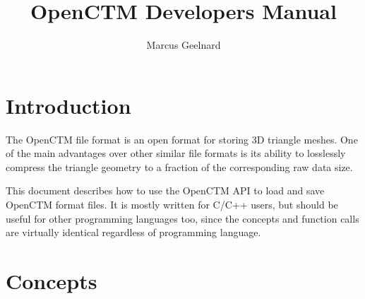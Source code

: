 %
%



\author{Marcus Geelnard}
\title{OpenCTM Developers Manual}




\maketitle

\tableofcontents



\chapter{Introduction}
The OpenCTM file format is an open format for storing 3D triangle meshes.
One of the main advantages over other similar file formats is its ability
to losslessly compress the triangle geometry to a fraction of the corresponding
raw data size.

This document describes how to use the OpenCTM API to load and save OpenCTM
format files. It is mostly written for C/C++ users, but should be useful for
other programming languages too, since the concepts and function calls are
virtually identical regardless of programming language.



\chapter{Concepts}

